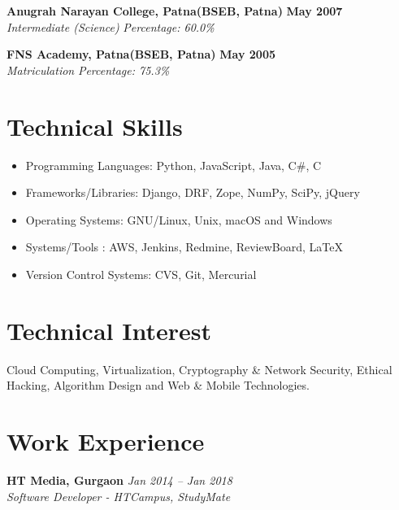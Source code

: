 \documentclass[margin,line]{resume}
\begin{document}
\begin{resume}
    \textbf{Anugrah Narayan College, Patna(BSEB, Patna)} \hfill \textbf{May 2007}\vspace{0mm}\\\vspace{0mm}%
    \textsl{Intermediate (Science)} \hfill \textsl{Percentage: 60.0\%}

    \textbf{FNS Academy, Patna(BSEB, Patna)} \hfill \textbf{May 2005}\vspace{0mm}\\\vspace{0mm}%
    \textsl{Matriculation } \hfill \textsl{Percentage: 75.3\%}
    \section{\mysidestyle Technical Skills}
     \begin{itemize}
      \item Programming Languages: Python, JavaScript, Java, C\#, C
      \item Frameworks/Libraries: Django, DRF, Zope, NumPy, SciPy, jQuery
      \item Operating Systems: GNU/Linux, Unix, macOS and Windows
      \item Systems/Tools : AWS, Jenkins, Redmine, ReviewBoard, \LaTeX
      \item Version Control Systems: CVS, Git, Mercurial      
     \end{itemize}
     \section{\mysidestyle Technical Interest}
        Cloud Computing, Virtualization, Cryptography \& Network Security, Ethical Hacking, Algorithm Design and Web \& Mobile Technologies.
    \section{\mysidestyle Work Experience}

    \textbf{HT Media, Gurgaon} \hfill \textsl{Jan 2014 -- Jan 2018} \vspace{0mm}\\\vspace{0mm}%
           \textsl{Software Developer - HTCampus, StudyMate}\\
    \begin{itemize}
    

\end{itemize}
\end{resume}
\end{document}

